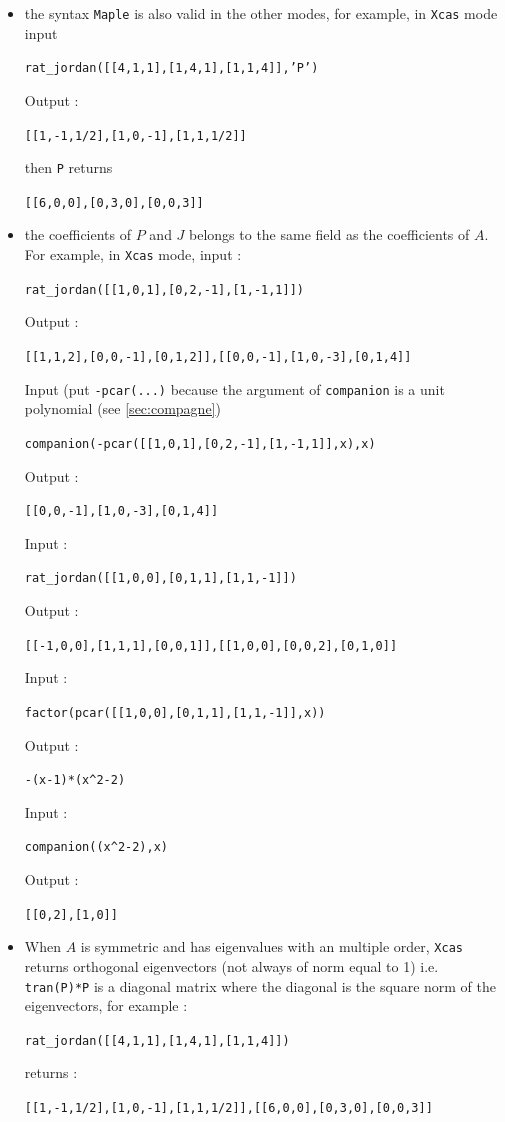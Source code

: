 \documentclass[a4paper,11pt]{book}
\begin{document}
\begin{itemize}
\item the syntax {\tt Maple} is also valid in the other modes, for example, in
{\tt Xcas} mode input 
\begin{center} {\tt rat\_jordan([[4,1,1],[1,4,1],[1,1,4]],'P')}
\end{center}
Output :
\begin{center} {\tt [[1,-1,1/2],[1,0,-1],[1,1,1/2]]}
\end{center}
then {\tt P} returns
\begin{center} {\tt [[6,0,0],[0,3,0],[0,0,3]]}
\end{center}
\item the coefficients of $P$ and $J$ belongs to the same field as the 
coefficients of $A$.\\
For example, in {\tt Xcas} mode, input :
\begin{center} {\tt rat\_jordan([[1,0,1],[0,2,-1],[1,-1,1]])}
\end{center}
Output :
\begin{center} {\tt [[1,1,2],[0,0,-1],[0,1,2]],[[0,0,-1],[1,0,-3],[0,1,4]]}\end{center}
Input (put {\tt -pcar(...)} because the argument of {\tt companion} is a unit 
polynomial (see \ref{sec:compagne})
\begin{center} {\tt companion(-pcar([[1,0,1],[0,2,-1],[1,-1,1]],x),x)}\end{center}
Output :
\begin{center} {\tt [[0,0,-1],[1,0,-3],[0,1,4]]}\end{center}
Input :
\begin{center} {\tt rat\_jordan([[1,0,0],[0,1,1],[1,1,-1]])}\end{center}
Output :
\begin{center} {\tt [[-1,0,0],[1,1,1],[0,0,1]],[[1,0,0],[0,0,2],[0,1,0]]}\end{center}
Input :
\begin{center} {\tt factor(pcar([[1,0,0],[0,1,1],[1,1,-1]],x))}\end{center}
Output :
\begin{center} {\tt -(x-1)*(x\verb|^|2-2)}\end{center}
Input :
\begin{center} {\tt companion((x\verb|^|2-2),x)}\end{center}
Output :
\begin{center} {\tt [[0,2],[1,0]]}\end{center}



\item When $A$ is symmetric and has eigenvalues with an multiple order,
{\tt Xcas} returns orthogonal eigenvectors (not always of norm equal to 1)
i.e. {\tt tran(P)*P} is a diagonal matrix where the diagonal is the square norm
of the eigenvectors, for example :
\begin{center} {\tt rat\_jordan([[4,1,1],[1,4,1],[1,1,4]])}
\end{center}
returns :
\begin{center} {\tt [[1,-1,1/2],[1,0,-1],[1,1,1/2]],[[6,0,0],[0,3,0],[0,0,3]]}
\end{center}
\end{itemize} 
\end{document}
